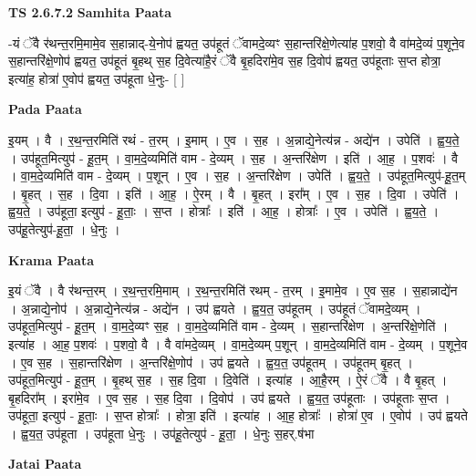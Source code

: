 \documentclass[17pt]{extarticle}
\begin{document}
\textbf{TS 2.6.7.2 } \newline
\textbf{Samhita Paata} \newline

-यं ॅवै र॑थन्त॒रमि॒मामे॒व स॒हान्नाद्-ये॒नोप॑ ह्वयत॒ उप॑हूतं ॅवामदे॒व्यꣳ स॒हान्तरि॑क्षे॒णेत्या॑ह प॒शवो॒ वै वा॑मदे॒व्यं प॒शूने॒व स॒हान्तरि॑क्षे॒णोप॑ ह्वयत॒ उप॑हूतं बृ॒हथ् स॒ह दि॒वेत्या॑है॒रं ॅवै बृ॒हदिरा॑मे॒व स॒ह दि॒वोप॑ ह्वयत॒ उप॑हूताः स॒प्त होत्रा॒ इत्या॑ह॒ होत्रा॑ ए॒वोप॑ ह्वयत॒ उप॑हूता धे॒नुः-  [  ] \newline

\textbf{Pada Paata} \newline

इ॒यम् । वै । र॒थ॒न्त॒रमिति॑ रथं - त॒रम् । इ॒माम् । ए॒व । स॒ह । अ॒न्नाद्ये॒नेत्य॑न्न - अद्ये॑न । उपेति॑ । ह्व॒य॒ते॒ । उप॑हूत॒मित्युप॑ - हू॒त॒म् । वा॒म॒दे॒व्यमिति॑ वाम - दे॒व्यम् । स॒ह । अ॒न्तरि॑क्षेण । इति॑ । आ॒ह॒ । प॒शवः॑ । वै । वा॒म॒दे॒व्यमिति॑ वाम - दे॒व्यम् । प॒शून् । ए॒व । स॒ह । अ॒न्तरि॑क्षेण । उपेति॑ । ह्व॒य॒ते॒ । उप॑हूत॒मित्युप॑-हू॒त॒म् । बृ॒हत् । स॒ह । दि॒वा । इति॑ । आ॒ह॒ । ऐ॒रम् । वै । बृ॒हत् । इरा᳚म् । ए॒व । स॒ह । दि॒वा । उपेति॑ । ह्व॒य॒ते॒ । उप॑हूता॒ इत्युप॑ - हू॒ताः॒ । स॒प्त । होत्राः᳚ । इति॑ । आ॒ह॒ । होत्राः᳚ । ए॒व । उपेति॑ । ह्व॒य॒ते॒ । उप॑हू॒तेत्युप॑-हू॒ता॒ । धे॒नुः ।  \newline


\textbf{Krama Paata} \newline

इ॒यं ॅवै । वै र॑थन्त॒रम् । र॒थ॒न्त॒रमि॒माम् । र॒थ॒न्त॒रमिति॑ रथम् - त॒रम् । इ॒मामे॒व । ए॒व स॒ह । स॒हान्नाद्ये॑न । अ॒न्नाद्ये॒नोप॑ । अ॒न्नाद्ये॒नेत्य॑न्न - अद्ये॑न । उप॑ ह्वयते । ह्व॒य॒त॒ उप॑हूतम् । उप॑हूतं ॅवामदे॒व्यम् । उप॑हूत॒मित्युप॑ - हू॒त॒म् । वा॒म॒दे॒व्यꣳ स॒ह । वा॒म॒दे॒व्यमिति॑ वाम - दे॒व्यम् । स॒हान्तरि॑क्षेण । अ॒न्तरि॑क्षे॒णेति॑ । इत्या॑ह । आ॒ह॒ प॒शवः॑ । प॒शवो॒ वै । वै वा॑मदे॒व्यम् । वा॒म॒दे॒व्यम् प॒शून् । वा॒म॒दे॒व्यमिति॑ वाम - दे॒व्यम् । प॒शूने॒व । ए॒व स॒ह । स॒हान्तरि॑क्षेण । अ॒न्तरि॑क्षे॒णोप॑ । उप॑ ह्वयते । ह्व॒य॒त॒ उप॑हूतम् । उप॑हूतम् बृ॒हत् । उप॑हूत॒मित्युप॑ - हू॒त॒म् । बृ॒हथ् स॒ह । स॒ह दि॒वा । दि॒वेति॑ । इत्या॑ह । आ॒है॒रम् । ऐ॒रं ॅवै । वै बृ॒हत् । बृ॒हदिरा᳚म् । इरा॑मे॒व । ए॒व स॒ह । स॒ह दि॒वा । दि॒वोप॑ । उप॑ ह्वयते । ह्व॒य॒त॒ उप॑हूताः । उप॑हूताः स॒प्त । उप॑हूता॒ इत्युप॑ - हू॒ताः॒ । स॒प्त होत्राः᳚ । होत्रा॒ इति॑ । इत्या॑ह । आ॒ह॒ होत्राः᳚ । होत्रा॑ ए॒व । ए॒वोप॑ । उप॑ ह्वयते । ह्व॒य॒त॒ उप॑हूता । उप॑हूता धे॒नुः । उप॑हू॒तेत्युप॑ - हू॒ता॒ । धे॒नुः स॒हर्.ष॑भा \newline

\textbf{Jatai Paata} \newline
\end{document}
